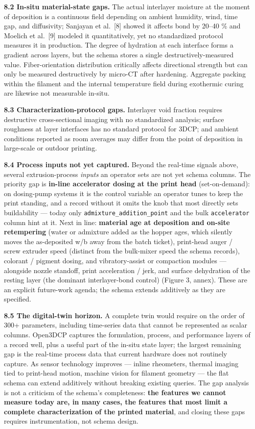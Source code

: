 \documentclass[
  11pt,
  letterpaper,
]{article}
\begin{document}
\textbf{8.2 In-situ material-state gaps.} The actual interlayer moisture
at the moment of deposition is a continuous field depending on ambient
humidity, wind, time gap, and diffusivity; Sanjayan et al.~{[}8{]}
showed it affects bond by 20--40 \% and Moelich et al.~{[}9{]} modeled
it quantitatively, yet no standardized protocol measures it in
production. The degree of hydration at each interface forms a gradient
across layers, but the schema stores a single destructively-measured
value. Fiber-orientation distribution critically affects directional
strength but can only be measured destructively by micro-CT after
hardening. Aggregate packing within the filament and the internal
temperature field during exothermic curing are likewise not measurable
in-situ.

\textbf{8.3 Characterization-protocol gaps.} Interlayer void fraction
requires destructive cross-sectional imaging with no standardized
analysis; surface roughness at layer interfaces has no standard protocol
for 3DCP; and ambient conditions reported as room averages may differ
from the point of deposition in large-scale or outdoor printing.

\textbf{8.4 Process inputs not yet captured.} Beyond the real-time
signals above, several extrusion-process \emph{inputs} an operator sets
are not yet schema columns. The priority gap is \textbf{in-line
accelerator dosing at the print head} (set-on-demand): on dosing-pump
systems it is the control variable an operator tunes to keep the print
standing, and a record without it omits the knob that most directly sets
buildability --- today only \texttt{admixture\_addition\_point} and the
bulk \texttt{accelerator} column hint at it. Next in line:
\textbf{material age at deposition and on-site retempering} (water or
admixture added as the hopper ages, which silently moves the
as-deposited w/b away from the batch ticket), print-head auger / screw
extruder speed (distinct from the bulk-mixer speed the schema records),
colorant / pigment dosing, and vibratory-assist or compaction modules
--- alongside nozzle standoff, print acceleration / jerk, and surface
dehydration of the resting layer (the dominant interlayer-bond control)
(Figure 3, annex). These are an explicit future-work agenda; the schema
extends additively as they are specified.

\textbf{8.5 The digital-twin horizon.} A complete twin would require on
the order of 300+ parameters, including time-series data that cannot be
represented as scalar columns. Open3DCP captures the formulation,
process, and performance layers of a record well, plus a useful part of
the in-situ state layer; the largest remaining gap is the real-time
process data that current hardware does not routinely capture. As sensor
technology improves --- inline rheometers, thermal imaging tied to
print-head motion, machine vision for filament geometry --- the flat
schema can extend additively without breaking existing queries. The gap
analysis is not a criticism of the schema's completeness: \textbf{the
features we cannot measure today are, in many cases, the features that
most limit a complete characterization of the printed material}, and
closing these gaps requires instrumentation, not schema design.
\end{document}
